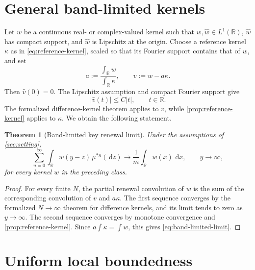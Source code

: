 \documentclass[10pt,reqno,a4paper]{amsart}
\numberwithin{equation}{section}
\theoremstyle{plain}
\newtheorem{theorem}{Theorem}[section]
\theoremstyle{definition}
\theoremstyle{remark}
\newcommand{\R}{\mathbb{R}}
\newcommand{\1}{\mathbf{1}}
\newcommand{\de}{\,\mathrm{d}}
\newcommand{\abs}[1]{\left|#1\right|}
\begin{document}
\section{General band-limited kernels}\label{sec:band-limited}

Let \(w\) be a continuous real- or complex-valued kernel such that
\(w,\widehat w\in L^1(\R)\), \(\widehat w\) has compact support, and
\(\widehat w\) is Lipschitz at the origin.  Choose a reference kernel
\(\kappa\) as in \cref{eq:reference-kernel}, scaled so that its Fourier support
contains that of \(w\), and set
\begin{equation}\label{eq:difference-decomposition}
  a:=\frac{\int_\R w}{\int_\R\kappa},
  \qquad
  v:=w-a\kappa.
\end{equation}
Then \(\widehat v(0)=0\).  The Lipschitz assumption and compact Fourier support
give
\begin{equation*}
  \abs{\widehat v(t)}\leq C\abs t,
  \qquad t\in\R.
\end{equation*}
The formalized difference-kernel theorem applies to \(v\), while
\cref{prop:reference-kernel} applies to \(\kappa\).  We obtain the following
statement.

\begin{theorem}[Band-limited key renewal limit]\label{thm:band-limited}
  Under the assumptions of \cref{sec:setting},
  \begin{equation}\label{eq:band-limited-limit}
    \sum_{n=0}^{\infty}
    \int_\R w(y-z)\,\mu^{*n}(\de z)
    \longrightarrow
    \frac{1}{m}\int_\R w(x)\,\de x,
    \qquad y\to\infty,
  \end{equation}
  for every kernel \(w\) in the preceding class.
\end{theorem}

\begin{proof}
  For every finite \(N\), the partial renewal convolution of \(w\) is the sum
  of the corresponding convolution of \(v\) and \(a\kappa\).  The first
  sequence converges by the formalized \(N\to\infty\) theorem for difference
  kernels, and its limit tends to zero as \(y\to\infty\).  The second sequence
  converges by monotone convergence and
  \cref{prop:reference-kernel}.  Since
  \(a\int\kappa=\int w\), this gives \cref{eq:band-limited-limit}.
\end{proof}

\section{Uniform local boundedness}\label{sec:local-bound}
\end{document}
